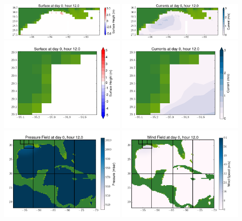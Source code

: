 \documentclass[11pt]{article}
\begin{document}
\includegraphics[width=0.475\textwidth]{frame0084fig4.png}
\vskip 10pt 
\includegraphics[width=0.475\textwidth]{frame0084fig5.png}
\includegraphics[width=0.475\textwidth]{frame0084fig6.png}
\vskip 10pt 
\includegraphics[width=0.475\textwidth]{frame0084fig7.png}
\includegraphics[width=0.475\textwidth]{frame0084fig8.png}
\vskip 10pt 
\includegraphics[width=0.475\textwidth]{frame0084fig9.png}
\end{document}

